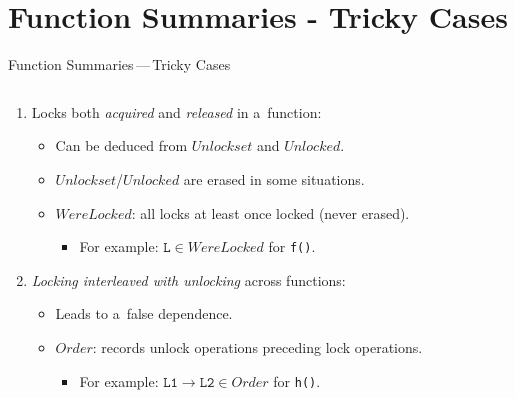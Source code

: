 \documentclass[10pt, xcolor=pdflatex, hyperref={unicode}, aspectratio=169]{beamer}
\begin{document}


\section{Function Summaries - Tricky Cases}
\begin{frame}{Function Summaries\,---\,Tricky Cases}
    \begin{columns}
        \begin{column}{.75 \linewidth}
            \begin{enumerate}
                \item Locks both \emph{acquired} and \emph{released} in a~function:
                    \vspace{.5em}
                    \begin{itemize}\setlength\itemsep{.5em}
                        \item Can be deduced from $ Unlockset $ and $ Unlocked $.

                        \item $ Unlockset $/$ Unlocked $ are erased in some situations.

                        \item \alert{$ WereLocked $}: all locks at least once locked (never erased).
                            \begin{itemize}
                                \item For example: $ \mathtt{L} \in WereLocked $ for \texttt{f()}.
                            \end{itemize}
                    \end{itemize}

                \vspace{2em}

                \item \emph{Locking interleaved with unlocking} across functions:
                \vspace{.5em}
                \begin{itemize}\setlength\itemsep{.5em}
                    \item Leads to a~false dependence.

                    \item \alert{$ Order $}: records unlock operations preceding lock operations.
                        \begin{itemize}
                            \item For example: $ \mathtt{L1} \rightarrow \mathtt{L2} \in Order $ for \texttt{h()}.
                        \end{itemize}
                \end{itemize}
            \end{enumerate}
        \end{column}


\end{columns}
\end{frame}
\end{document}
